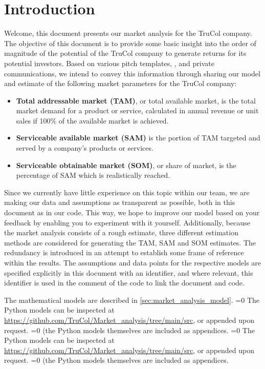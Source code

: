 \section{Introduction}\label{sec:intro}
Welcome, this document presents our market analysis for the TruCol company. The objective of this document is to provide some basic insight into the order of magnitude of the potential of the TruCol company to generate returns for its potential investors. Based on various pitch templates, \cite{kamps2020}, and private communications, we intend to convey this information through sharing our model and estimate of the following market parameters for the TruCol company:

\begin{itemize}
	\item \textbf{Total addressable market (TAM)}, or total available market, is the total market demand for a product or service, calculated in annual revenue or unit sales if 100\% of the available market is achieved\cite{tam_sam_som}.
	\item \textbf{Serviceable available market (SAM)} is the portion of TAM targeted and served by a company's products or services\cite{tam_sam_som}.
	\item \textbf{Serviceable obtainable market (SOM)}, or share of market, is the percentage of SAM which is realistically reached\cite{tam_sam_som}.
\end{itemize}


\noindent Since we currently have little experience on this topic within our team, we are making our data and assumptions as transparent as possible, both in this document as in our code. This way, we hope to improve our model based on your feedback by enabling you to experiment with it yourself. Additionally, because the market analysis consists of a rough estimate, three different estimation methods are considered for generating the TAM, SAM and SOM estimates. The redundancy is introduced in an attempt to establish some frame of reference within the results. %
The assumptions and data points for the respective models are specified explicitly in this document with an identifier, and where relevant, this identifier is used in the comment of the code to link the document and code.


The mathematical models are described in \cref{sec:market_analysis_model}.
\ifnum{}=0
The Python models can be inspected at \url{https://github.com/TruCol/Market_analysis/tree/main/src}, or appended upon request.
\fi
\ifnum{}=0
(the Python models themselves are included as appendices.
\fi
\ifnum{}=0
The Python models can be inspected at \url{https://github.com/TruCol/Market_analysis/tree/main/src}, or appended upon request.
\fi
\ifnum{}=0
(the Python models themselves are included as appendices.
\fi



